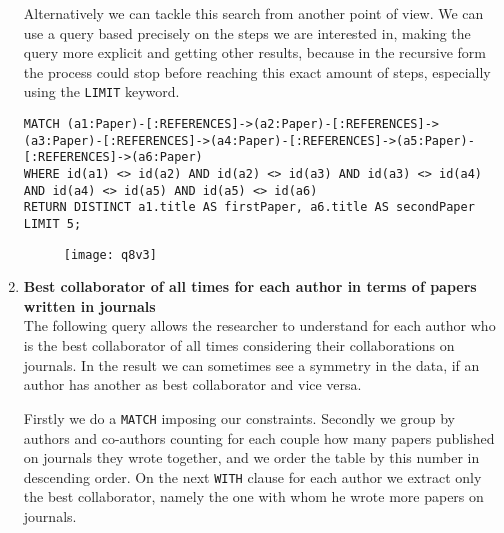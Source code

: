 \begin{enumerate}
\begin{figure}[H]
\begin{center}
        \end{center}
    \end{figure}
    Alternatively we can tackle this search from another point of view.
    We can use a query based precisely on the steps we are interested in, making the query more explicit and getting other results, because in the recursive form the process could stop before reaching this exact amount of steps, especially using the \verb|LIMIT| keyword.
    \begin{lstlisting}[label={lst:lstlisting37}]
MATCH (a1:Paper)-[:REFERENCES]->(a2:Paper)-[:REFERENCES]->(a3:Paper)-[:REFERENCES]->(a4:Paper)-[:REFERENCES]->(a5:Paper)-[:REFERENCES]->(a6:Paper)
WHERE id(a1) <> id(a2) AND id(a2) <> id(a3) AND id(a3) <> id(a4) AND id(a4) <> id(a5) AND id(a5) <> id(a6)
RETURN DISTINCT a1.title AS firstPaper, a6.title AS secondPaper
LIMIT 5;
    \end{lstlisting}
    \begin{figure}[H]
        \begin{center}
            \texttt{[image: q8v3]}
            \label{fig:q8v3}%
        \end{center}
    \end{figure}
    \item \textbf{Best collaborator of all times for each author in terms of papers written in journals}\\
    The following query allows the researcher to understand for each author who is the best collaborator of all times considering their collaborations on journals.
    In the result we can sometimes see a symmetry in the data, if an author has another as best collaborator and vice versa.

    Firstly we do a \verb|MATCH| imposing our constraints.
    Secondly we group by authors and co-authors counting for each couple how many papers published on journals they wrote together, and we order the table by this number in descending order.
    On the next \verb|WITH| clause for each author we extract only the best collaborator, namely the one with whom he wrote more papers on journals.


\end{enumerate}
